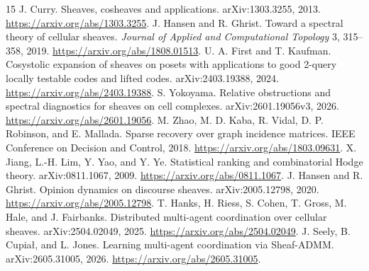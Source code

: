\documentclass[11pt,a4paper]{article}
\begin{document}
\begin{thebibliography}{15}
 J. Curry. Sheaves, cosheaves and applications. arXiv:1303.3255, 2013. \url{https://arxiv.org/abs/1303.3255}.
 J. Hansen and R. Ghrist. Toward a spectral theory of cellular sheaves. \emph{Journal of Applied and Computational Topology} 3, 315--358, 2019. \url{https://arxiv.org/abs/1808.01513}.
 U. A. First and T. Kaufman. Cosystolic expansion of sheaves on posets with applications to good 2-query locally testable codes and lifted codes. arXiv:2403.19388, 2024. \url{https://arxiv.org/abs/2403.19388}.
 S. Yokoyama. Relative obstructions and spectral diagnostics for sheaves on cell complexes. arXiv:2601.19056v3, 2026. \url{https://arxiv.org/abs/2601.19056}.
 M. Zhao, M. D. Kaba, R. Vidal, D. P. Robinson, and E. Mallada. Sparse recovery over graph incidence matrices. IEEE Conference on Decision and Control, 2018. \url{https://arxiv.org/abs/1803.09631}.
 X. Jiang, L.-H. Lim, Y. Yao, and Y. Ye. Statistical ranking and combinatorial Hodge theory. arXiv:0811.1067, 2009. \url{https://arxiv.org/abs/0811.1067}.
 J. Hansen and R. Ghrist. Opinion dynamics on discourse sheaves. arXiv:2005.12798, 2020. \url{https://arxiv.org/abs/2005.12798}.
 T. Hanks, H. Riess, S. Cohen, T. Gross, M. Hale, and J. Fairbanks. Distributed multi-agent coordination over cellular sheaves. arXiv:2504.02049, 2025. \url{https://arxiv.org/abs/2504.02049}.
 J. Seely, B. Cupia\l{}, and L. Jones. Learning multi-agent coordination via Sheaf-ADMM. arXiv:2605.31005, 2026. \url{https://arxiv.org/abs/2605.31005}.
\end{thebibliography}
\end{document}
